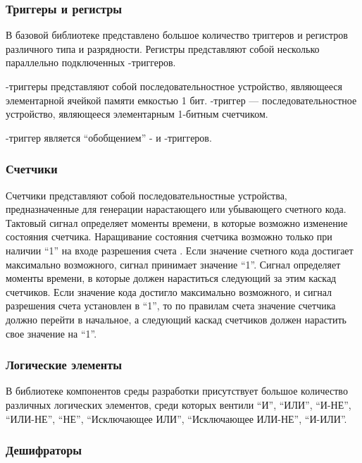 \subsubsection{Триггеры и регистры}

В базовой библиотеке представлено большое количество триггеров и регистров различного типа и разрядности. Регистры представляют собой несколько параллельно подключенных -триггеров.

-триггеры представляют собой последовательностное устройство, являющееся элементарной ячейкой памяти емкостью 1 бит. -триггер --- последовательностное устройство, являющееся элементарным 1-битным счетчиком.

-триггер является \enquote{обобщением} - и -триггеров.

\subsubsection{Счетчики}

Счетчики представляют собой последовательностные устройства, предназначенные для генерации нарастающего или убывающего счетного кода. Тактовый сигнал  определяет моменты времени, в которые возможно изменение состояния счетчика. Наращивание состояния счетчика возможно только при наличии \enquote{1} на входе разрешения счета . Если значение счетного кода достигает максимально возможного, сигнал  принимает значение \enquote{1}. Сигнал  определяет моменты времени, в которые должен нараститься следующий за этим каскад счетчиков. Если значение кода достигло максимально возможного, и сигнал разрешения счета  установлен в \enquote{1}, то по правилам счета значение счетчика должно перейти в начальное, а следующий каскад счетчиков должен нарастить свое значение на \enquote{1}.

\subsubsection{Логические элементы}

В библиотеке компонентов среды разработки присутствует большое количество различных логических элементов, среди которых вентили \enquote{И}, \enquote{ИЛИ}, \enquote{И-НЕ}, \enquote{ИЛИ-НЕ}, \enquote{НЕ}, \enquote{Исключающее ИЛИ}, \enquote{Исключающее ИЛИ-НЕ}, \enquote{И-ИЛИ}.

\subsubsection{Дешифраторы}

